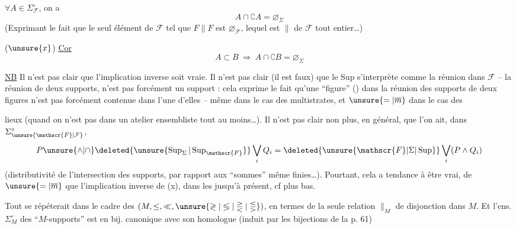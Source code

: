  $\forall A\in\Sigma_{\mathscr{F}}^\circ$, on a
\[
A\cap\complement A=\varnothing_\Sigma
\]
(Exprimant le fait que le seul élément de $\mathscr{F}$  tel que $F\parallel F$ est $\varnothing_{\mathscr{F}}$, lequel est $\parallel$ de $\mathscr{F}$ tout entier\ldots)

($\unsure{x}$) \uline{Cor}
\[
A\subset B\ \Longrightarrow\ A\cap\complement B=\varnothing_\Sigma
\]

\uline{NB} Il n'est pas clair que l'implication inverse soit vraie.  Il n'est pas clair  (il est  faux) que le Sup  s'interprète comme la réunion dans $\mathscr{F}$ -- la réunion de deux supports, n'est pas forcément un support : cela exprime le fait qu'une ``figure'' () dans la réunion des supports de deux figures n'est pas forcément contenue dans l'une d'elles -- même dans le cas des multistrates, et $\unsure{=|\overline m}$ dans le cas des


lieux (quand on n'est pas dans un atelier ensembliste tout au moins\ldots). Il n'est pas clair non plus, en général, que l'on ait, dans $\Sigma_{\unsure{\mathscr{F}|\mathcal{F}}}^\circ$,
\[
P\unsure{\wedge|\cap}\deleted{\unsure{\operatorname{Sup}_\Sigma|\operatorname{Sup}_{\mathscr{F}}}}\bigvee_i Q_i=\deleted{\unsure{\mathscr{F}|\Sigma|\operatorname{Sup}}}\bigvee_i(P\wedge Q_i)
\]
(distributivité de l'intersection des supports, par rapport aux ``sommes'' même finies\ldots).
Pourtant, cela a tendance à être vrai, de $\unsure{=|\overline m}$ que l'implication inverse de (x), dans les  jusqu'à présent, cf plus bas.

Tout  se répéterait dans le cadre des  $(M,\leq,\ll,\unsure{\gtrless|\lessgtr|\gtreqless|\lesseqgtr})$,  en termes de la seule relation $\parallel_M$  de disjonction dans $M$. Et l'ens. $\Sigma_M^\circ$ des ``$M$-supports'' est en bij. canonique avec son homologue
(induit par les bijections de la p. 61)

